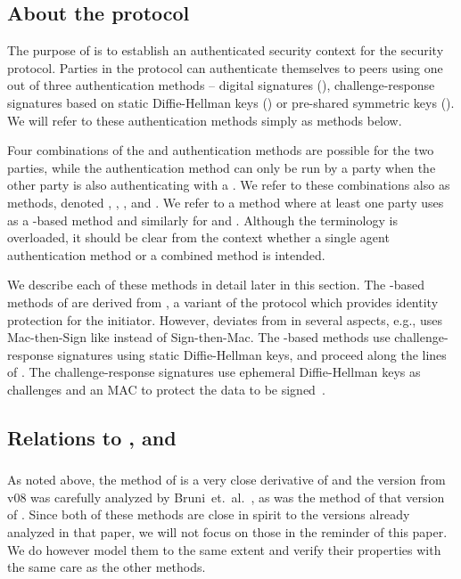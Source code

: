 

\subsection{About the protocol}
The purpose of \mEdhoc{} is to establish an authenticated security context
for the \mOscore{} security protocol.
Parties in the \mEdhoc{} protocol can authenticate
themselves to peers using one out of three authentication methods -- digital
signatures
(\mSig), challenge-response signatures based on static Diffie-Hellman keys
(\mStat) or pre-shared symmetric keys (\mPsk).
We will refer to these authentication methods simply as methods below.

Four combinations of the \mSig{} and \mStat{} authentication methods are possible for the two parties, while the \mPsk{} authentication method can only be run by {a party when the other party is} also authenticating with a \mPsk. We refer to these combinations also as methods, denoted \mSigSig, \mSigStat, \mStatStat, \mStatSig{} and \mPskPsk. {We refer to a method where at least one party uses \mSig{} as a \mSig-based method and similarly for \mStat{} and \mPsk.}
Although the terminology is overloaded, it should be clear from the context whether a single agent authentication method or a combined method is intended.

We describe each of these methods in detail later in this section.
The \mSig-based methods of \mEdhoc{} {are derived from} \mSigmaI, a variant of the \mSigma{} protocol which provides identity protection for the initiator. However, \mEdhoc{} deviates from \mSigmaI{} in several aspects, e.g., \mEdhoc{} uses Mac-then-Sign like \mTls{} instead of Sign-then-Mac. The \mStat-based methods use challenge-response signatures using static Diffie-Hellman keys, and proceed along the lines of \mOptls. The challenge-response signatures use ephemeral Diffie-Hellman keys as challenges and an \mAead{} MAC to protect the data to be signed~\cite{aead,rfc5116,DBLP:conf/eurosp/KrawczykW16}.


\subsection{Relations to \mSigma, \mOptls{} and \mNoise{}}
\subsubsection{\mSigma{}}
As noted above, the \mSigSig{} method of \mEdhoc{} is a very close
derivative of \mSigmaI{} and the version from \mEdhoc{} v08 was carefully analyzed by
Bruni~et.~al.~\cite{DBLP:conf/secsr/BruniJPS18}, as was the \mPskPsk{} method of that version of \mEdhoc{}. Since both of these methods are close in spirit to the versions already analyzed in that paper, we will not focus on those in the reminder of this paper. We do however model them to the same extent and
verify their properties with the same care as the other methods.

